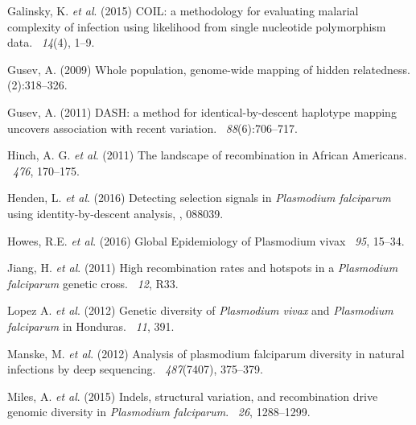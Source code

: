 \documentclass[9pt,lineno]{elife}
\begin{document}
\begin{thebibliography}{}
Galinsky, K. {\em et al}. (2015)
\newblock COIL: a methodology for evaluating malarial complexity of infection using likelihood from single nucleotide polymorphism data.
~{\em14\/}(4), 1--9.

Gusev, A. (2009)
\newblock Whole population, genome-wide mapping of hidden relatedness.
(2):318--326.

Gusev, A. (2011)
\newblock DASH: a method for identical-by-descent haplotype mapping uncovers association with recent variation.
~{\em 88}(6):706--717.

Hinch, A. G. {\em et al}. (2011)
\newblock The landscape of recombination in African Americans.
~{\em 476}, 170--175.

Henden, L. {\em et al}. (2016)
\newblock Detecting selection signals in {\it Plasmodium falciparum} using identity-by-descent analysis,
, 088039.

Howes, R.E. {\em et al}. (2016)
\newblock Global Epidemiology of Plasmodium vivax
~{\em 95}, 15--34.

Jiang, H. {\em et al}. (2011)
\newblock High recombination rates and hotspots in a {\it Plasmodium falciparum} genetic cross.
~{\em 12}, R33.

Lopez A. {\em et al}. (2012)
\newblock Genetic diversity of {\it Plasmodium vivax} and {\it Plasmodium falciparum} in Honduras.
~{\em 11}, 391.

Manske, M. {\em et al}. (2012)
\newblock Analysis of plasmodium falciparum diversity in natural infections by deep sequencing.
~{\em 487\/}(7407), 375--379.

Miles, A. {\em et al}. (2015)
\newblock Indels, structural variation, and recombination drive genomic diversity in {\it Plasmodium falciparum}.
~{\em26\/}, 1288--1299.


\end{thebibliography}
\end{document}
